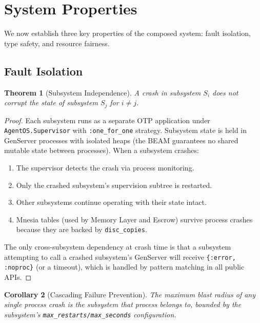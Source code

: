 \documentclass[12pt,a4paper]{article}
\newtheorem{theorem}{Theorem}[section]
\newtheorem{corollary}[theorem]{Corollary}
\theoremstyle{definition}
\begin{document}
\section{System Properties}\label{sec:properties}

We now establish three key properties of the composed system: fault isolation,
type safety, and resource fairness.

\subsection{Fault Isolation}

\begin{theorem}[Subsystem Independence]\label{thm:fault-isolation}
A crash in subsystem $S_i$ does not corrupt the state of subsystem $S_j$ for $i \neq j$.
\end{theorem}

\begin{proof}
Each subsystem runs as a separate OTP application under \texttt{AgentOS.Supervisor}
with \texttt{:one\_for\_one} strategy. Subsystem state is held in GenServer
processes with isolated heaps (the BEAM guarantees no shared mutable state between
processes). When a subsystem crashes:

\begin{enumerate}
  \item The supervisor detects the crash via process monitoring.
  \item Only the crashed subsystem's supervision subtree is restarted.
  \item Other subsystems continue operating with their state intact.
  \item Mnesia tables (used by Memory Layer and Escrow) survive process crashes
        because they are backed by \texttt{disc\_copies}.
\end{enumerate}

The only cross-subsystem dependency at crash time is that a subsystem attempting
to call a crashed subsystem's GenServer will receive \texttt{\{:error, :noproc\}}
(or a timeout), which is handled by pattern matching in all public APIs.
\end{proof}

\begin{corollary}[Cascading Failure Prevention]
The maximum blast radius of any single process crash is the subsystem that process
belongs to, bounded by the subsystem's \texttt{max\_restarts/max\_seconds} configuration.
\end{corollary}
\end{document}
